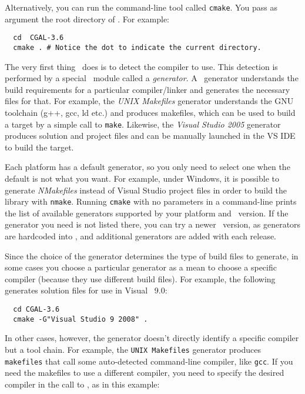 Alternatively, you can run the command-line tool called
\texttt{cmake}. You pass as argument the root directory of
\cgal. For example:

{\ccTexHtml{\scriptsize}{}
\begin{verbatim}
  cd  CGAL-3.6
  cmake . # Notice the dot to indicate the current directory.
\end{verbatim}
}


The very first thing \cmake\ does is to detect the compiler to use.  This
detection is performed by a special \cmake\ module called a {\em
  generator}. A \cmake\ generator understands the build requirements for a
particular compiler/linker and generates the necessary files for that. For
example, the {\em UNIX Makefiles} generator understands the GNU toolchain
(g++, gcc, ld etc.) and produces makefiles, which can be used to build a
target by a simple call to \texttt{make}.  Likewise, the {\em Visual Studio
  2005} generator produces solution and project files and can be manually
launched in the VS IDE to build the target.

Each platform has a default generator, so you only need to select one when
the default is not what you want.  For example, under Windows, it is
possible to generate {\em NMakefiles} instead of Visual Studio project
files in order to build the library with \texttt{nmake}.  Running
\texttt{cmake} with no parameters in a command-line prints the list of
available generators supported by your platform and \cmake\ version. If the
generator you need is not listed there, you can try a newer \cmake\
version, as generators are hardcoded into \cmake, and additional
generators are added with each release.

Since the choice of the generator determines the type of build files to generate, in some cases
you choose a particular generator as a mean to choose a specific compiler (because they use different 
build files). For example, the following generates solution files for use in Visual \CC\ 9.0:

{\ccTexHtml{\scriptsize}{}
\begin{verbatim}
  cd CGAL-3.6
  cmake -G"Visual Studio 9 2008" . 
\end{verbatim}
}

In other cases, however, the generator doesn't directly identify a specific compiler but a tool chain.
For example, the \texttt{UNIX Makefiles} generator produces \texttt{makefiles} that call some auto-detected
command-line compiler, like \texttt{gcc}. If you need the makefiles to use a different compiler, you need to
specify the desired compiler in the call to \cmake{}, as in this example:

